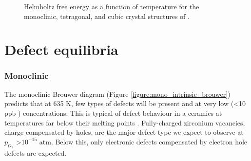 \begin{figure}[ht] %
\begin{center}
		\caption{Helmholtz free energy as a function of temperature for the monoclinic, tetragonal, and cubic crystal structures of \zirconia .}
		\label{Figure:helmholtz}
	\end{center}
\end{figure}

\section{Defect equilibria}

\subsubsection*{Monoclinic}

The monoclinic Brouwer diagram (Figure \ref{figure:mono_intrinsic_brouwer}) predicts that at 635 K, few types of defects will be present and at very low (\textless 10 ppb \zirconia ) concentrations. This is typical of defect behaviour in a ceramics at temperatures far below their melting points \cite{kingery1997physical,ball2006computer}. Fully-charged zirconium vacancies, charge-compensated by holes, are the major defect type we expect to observe at $p_{O_{2}}$ \textgreater $10^{-15}$ atm. Below this, only electronic defects compensated by electron hole defects are expected. 


